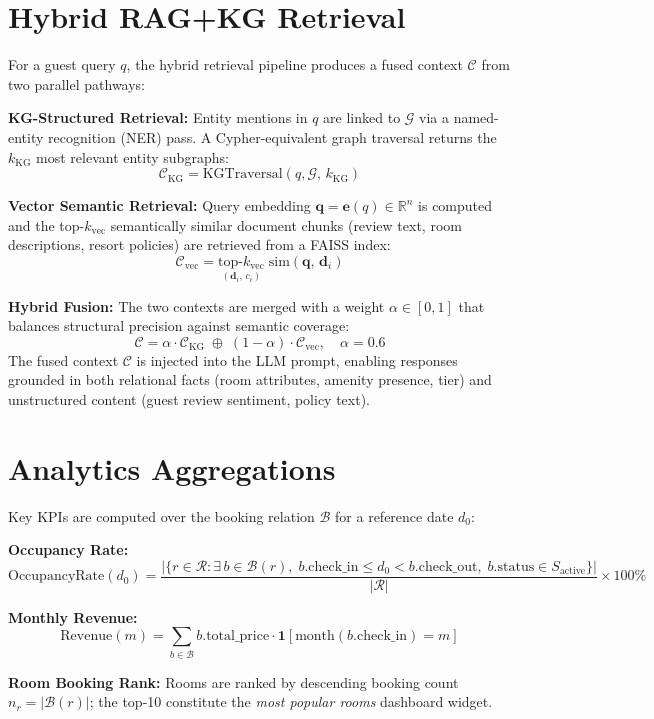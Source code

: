 \documentclass[11pt,a4paper]{report}
\begin{document}
\section{Hybrid RAG+KG Retrieval}

For a guest query $q$, the hybrid retrieval pipeline produces a fused context $\mathcal{C}$ from two parallel pathways:

\textbf{KG-Structured Retrieval:} Entity mentions in $q$ are linked to $\mathcal{G}$ via a named-entity recognition (NER) pass. A Cypher-equivalent graph traversal returns the $k_{\text{KG}}$ most relevant entity subgraphs:
\[
\mathcal{C}_{\text{KG}} = \text{KGTraversal}(q, \mathcal{G},\, k_{\text{KG}})
\]

\textbf{Vector Semantic Retrieval:} Query embedding $\mathbf{q} = \mathbf{e}(q) \in \mathbb{R}^n$ is computed and the top-$k_{\text{vec}}$ semantically similar document chunks (review text, room descriptions, resort policies) are retrieved from a FAISS index:
\[
\mathcal{C}_{\text{vec}} = \underset{(\mathbf{d}_i,\, c_i)}{\text{top-}k_{\text{vec}}}\; \text{sim}(\mathbf{q},\, \mathbf{d}_i)
\]

\textbf{Hybrid Fusion:} The two contexts are merged with a weight $\alpha \in [0,1]$ that balances structural precision against semantic coverage:
\[
\mathcal{C} = \alpha \cdot \mathcal{C}_{\text{KG}} \;\oplus\; (1-\alpha) \cdot \mathcal{C}_{\text{vec}}, \quad \alpha = 0.6
\]
The fused context $\mathcal{C}$ is injected into the LLM prompt, enabling responses grounded in both relational facts (room attributes, amenity presence, tier) and unstructured content (guest review sentiment, policy text).

\section{Analytics Aggregations}

Key KPIs are computed over the booking relation $\mathcal{B}$ for a reference date $d_0$:

\textbf{Occupancy Rate:}
\[
\text{OccupancyRate}(d_0) = \frac{|\{r \in \mathcal{R} : \exists\, b \in \mathcal{B}(r),\; b.\text{check\_in} \leq d_0 < b.\text{check\_out},\; b.\text{status} \in S_{\text{active}}\}|}{|\mathcal{R}|} \times 100\%
\]

\textbf{Monthly Revenue:}
\[
\text{Revenue}(m) = \sum_{b \in \mathcal{B}} b.\text{total\_price} \cdot \mathbf{1}[\text{month}(b.\text{check\_in}) = m]
\]

\textbf{Room Booking Rank:} Rooms are ranked by descending booking count $n_r = |\mathcal{B}(r)|$; the top-10 constitute the \emph{most popular rooms} dashboard widget.
\end{document}
